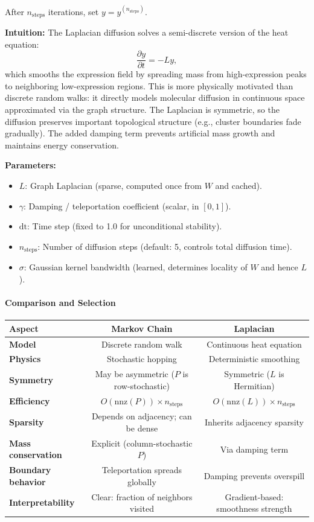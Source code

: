 \documentclass[11pt]{article}
\begin{document}
After $n_{\text{steps}}$ iterations, set $y = y^{(n_{\text{steps}})}$.

\textbf{Intuition:}
The Laplacian diffusion solves a semi-discrete version of the heat equation:
\[
\frac{\partial y}{\partial t} = -L y,
\]
which smooths the expression field by spreading mass from high-expression peaks to neighboring low-expression regions. This is more physically motivated than discrete random walks: it directly models molecular diffusion in continuous space approximated via the graph structure. The Laplacian is symmetric, so the diffusion preserves important topological structure (e.g., cluster boundaries fade gradually). The added damping term prevents artificial mass growth and maintains energy conservation.

\textbf{Parameters:}
\begin{itemize}
  \item $L$: Graph Laplacian (sparse, computed once from $W$ and cached).
  \item $\gamma$: Damping / teleportation coefficient (scalar, in $[0,1]$).
  \item $\text{dt}$: Time step (fixed to 1.0 for unconditional stability).
  \item $n_{\text{steps}}$: Number of diffusion steps (default: 5, controls total diffusion time).
  \item $\sigma$: Gaussian kernel bandwidth (learned, determines locality of $W$ and hence $L$).
\end{itemize}

\paragraph{Comparison and Selection}

\begin{table}[h]
\centering
\begin{tabular}{|l|c|c|}
\hline
\textbf{Aspect} & \textbf{Markov Chain} & \textbf{Laplacian} \\
\hline
\textbf{Model} & Discrete random walk & Continuous heat equation \\
\hline
\textbf{Physics} & Stochastic hopping & Deterministic smoothing \\
\hline
\textbf{Symmetry} & May be asymmetric ($P$ is row-stochastic) & Symmetric ($L$ is Hermitian) \\
\hline
\textbf{Efficiency} & $O(\text{nnz}(P)) \times n_{\text{steps}}$ & $O(\text{nnz}(L)) \times n_{\text{steps}}$ \\
\hline
\textbf{Sparsity} & Depends on adjacency; can be dense & Inherits adjacency sparsity \\
\hline
\textbf{Mass conservation} & Explicit (column-stochastic $P$) & Via damping term \\
\hline
\textbf{Boundary behavior} & Teleportation spreads globally & Damping prevents overspill \\
\hline
\textbf{Interpretability} & Clear: fraction of neighbors visited & Gradient-based: smoothness strength \\
\hline
\end{tabular}
\end{table}
\end{document}
